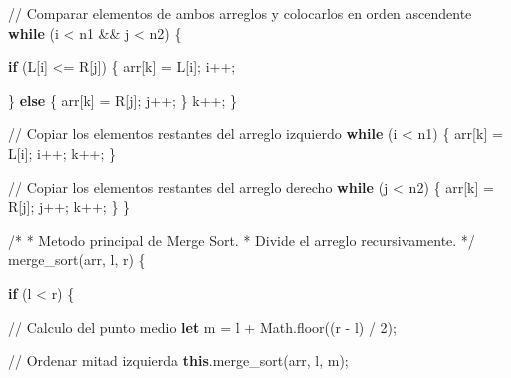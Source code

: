 \documentclass[
  spanish,
  letterpaper,
  DIV=11,
  numbers=noendperiod]{scrreprt}
\newenvironment{Shaded}{\begin{snugshade}}{\end{snugshade}}
\newcommand{\BuiltInTok}[1]{\textcolor[rgb]{0.00,0.23,0.31}{#1}}
\newcommand{\CommentTok}[1]{\textcolor[rgb]{0.37,0.37,0.37}{#1}}
\newcommand{\ControlFlowTok}[1]{\textcolor[rgb]{0.00,0.23,0.31}{\textbf{#1}}}
\newcommand{\DecValTok}[1]{\textcolor[rgb]{0.68,0.00,0.00}{#1}}
\newcommand{\FunctionTok}[1]{\textcolor[rgb]{0.28,0.35,0.67}{#1}}
\newcommand{\KeywordTok}[1]{\textcolor[rgb]{0.00,0.23,0.31}{\textbf{#1}}}
\newcommand{\NormalTok}[1]{\textcolor[rgb]{0.00,0.23,0.31}{#1}}
\newcommand{\OperatorTok}[1]{\textcolor[rgb]{0.37,0.37,0.37}{#1}}
\begin{document}
\begin{Shaded}
\begin{Highlighting}[]
        \CommentTok{// Comparar elementos de ambos arreglos y colocarlos en orden ascendente}
        \ControlFlowTok{while}\NormalTok{ (i }\OperatorTok{\textless{}}\NormalTok{ n1 }\OperatorTok{\&\&}\NormalTok{ j }\OperatorTok{\textless{}}\NormalTok{ n2) \{}

            \ControlFlowTok{if}\NormalTok{ (L[i] }\OperatorTok{\textless{}=}\NormalTok{ R[j]) \{}
\NormalTok{                arr[k] }\OperatorTok{=}\NormalTok{ L[i]}\OperatorTok{;}
\NormalTok{                i}\OperatorTok{++;}

\NormalTok{            \} }\ControlFlowTok{else}\NormalTok{ \{}
\NormalTok{                arr[k] }\OperatorTok{=}\NormalTok{ R[j]}\OperatorTok{;}
\NormalTok{                j}\OperatorTok{++;}
\NormalTok{            \}}
\NormalTok{            k}\OperatorTok{++;}
\NormalTok{        \}}

        \CommentTok{// Copiar los elementos restantes del arreglo izquierdo}
        \ControlFlowTok{while}\NormalTok{ (i }\OperatorTok{\textless{}}\NormalTok{ n1) \{}
\NormalTok{            arr[k] }\OperatorTok{=}\NormalTok{ L[i]}\OperatorTok{;}
\NormalTok{            i}\OperatorTok{++;}
\NormalTok{            k}\OperatorTok{++;}
\NormalTok{        \}}

        \CommentTok{// Copiar los elementos restantes del arreglo derecho}
        \ControlFlowTok{while}\NormalTok{ (j }\OperatorTok{\textless{}}\NormalTok{ n2) \{}
\NormalTok{            arr[k] }\OperatorTok{=}\NormalTok{ R[j]}\OperatorTok{;}
\NormalTok{            j}\OperatorTok{++;}
\NormalTok{            k}\OperatorTok{++;}
\NormalTok{        \}}
\NormalTok{    \}}

    \CommentTok{/*}
\CommentTok{     * Metodo principal de Merge Sort.}
\CommentTok{     * Divide el arreglo recursivamente.}
\CommentTok{     */}
    \FunctionTok{merge\_sort}\NormalTok{(arr}\OperatorTok{,}\NormalTok{ l}\OperatorTok{,}\NormalTok{ r) \{}

        \ControlFlowTok{if}\NormalTok{ (l }\OperatorTok{\textless{}}\NormalTok{ r) \{}

            \CommentTok{// Calculo del punto medio}
            \KeywordTok{let}\NormalTok{ m }\OperatorTok{=}\NormalTok{ l }\OperatorTok{+} \BuiltInTok{Math}\OperatorTok{.}\FunctionTok{floor}\NormalTok{((r }\OperatorTok{{-}}\NormalTok{ l) }\OperatorTok{/} \DecValTok{2}\NormalTok{)}\OperatorTok{;}

            \CommentTok{// Ordenar mitad izquierda}
            \KeywordTok{this}\OperatorTok{.}\FunctionTok{merge\_sort}\NormalTok{(arr}\OperatorTok{,}\NormalTok{ l}\OperatorTok{,}\NormalTok{ m)}\OperatorTok{;}


\end{Highlighting}
\end{Shaded}
\end{document}
